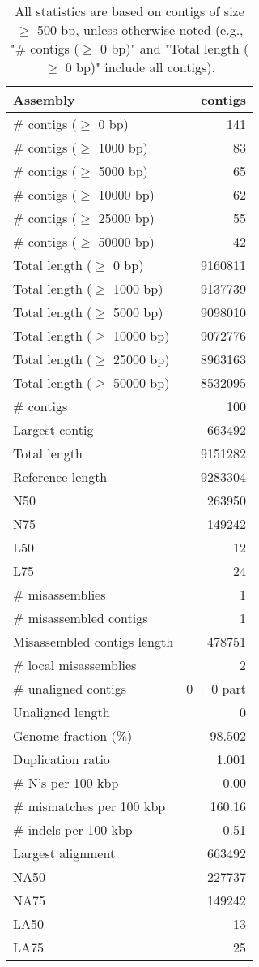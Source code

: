 \documentclass[12pt,a4paper]{article}
\begin{document}
\begin{table}[ht]
\begin{center}
\caption{All statistics are based on contigs of size $\geq$ 500 bp, unless otherwise noted (e.g., "\# contigs ($\geq$ 0 bp)" and "Total length ($\geq$ 0 bp)" include all contigs).}
\begin{tabular}{|l*{1}{|r}|}
\hline
Assembly & contigs \\ \hline
\# contigs ($\geq$ 0 bp) & 141 \\ \hline
\# contigs ($\geq$ 1000 bp) & 83 \\ \hline
\# contigs ($\geq$ 5000 bp) & 65 \\ \hline
\# contigs ($\geq$ 10000 bp) & 62 \\ \hline
\# contigs ($\geq$ 25000 bp) & 55 \\ \hline
\# contigs ($\geq$ 50000 bp) & 42 \\ \hline
Total length ($\geq$ 0 bp) & 9160811 \\ \hline
Total length ($\geq$ 1000 bp) & 9137739 \\ \hline
Total length ($\geq$ 5000 bp) & 9098010 \\ \hline
Total length ($\geq$ 10000 bp) & 9072776 \\ \hline
Total length ($\geq$ 25000 bp) & 8963163 \\ \hline
Total length ($\geq$ 50000 bp) & 8532095 \\ \hline
\# contigs & 100 \\ \hline
Largest contig & 663492 \\ \hline
Total length & 9151282 \\ \hline
Reference length & 9283304 \\ \hline
N50 & 263950 \\ \hline
N75 & 149242 \\ \hline
L50 & 12 \\ \hline
L75 & 24 \\ \hline
\# misassemblies & 1 \\ \hline
\# misassembled contigs & 1 \\ \hline
Misassembled contigs length & 478751 \\ \hline
\# local misassemblies & 2 \\ \hline
\# unaligned contigs & 0 + 0 part \\ \hline
Unaligned length & 0 \\ \hline
Genome fraction (\%) & 98.502 \\ \hline
Duplication ratio & 1.001 \\ \hline
\# N's per 100 kbp & 0.00 \\ \hline
\# mismatches per 100 kbp & 160.16 \\ \hline
\# indels per 100 kbp & 0.51 \\ \hline
Largest alignment & 663492 \\ \hline
NA50 & 227737 \\ \hline
NA75 & 149242 \\ \hline
LA50 & 13 \\ \hline
LA75 & 25 \\ \hline
\end{tabular}
\end{center}
\end{table}
\end{document}
